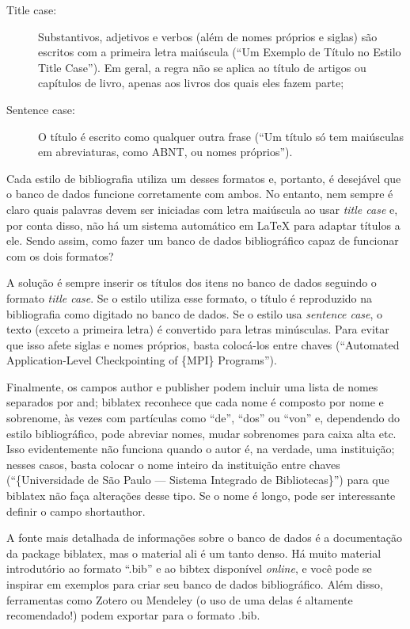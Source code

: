 \begin{description}
  \item[Title case:] Substantivos, adjetivos e verbos (além de nomes
  próprios e siglas) são escritos com a primeira letra maiúscula (``Um
  Exemplo de Título no Estilo Title Case''). Em geral, a regra não se
  aplica ao título de artigos ou capítulos de livro, apenas aos livros
  dos quais eles fazem parte;

  \item[Sentence case:] O título é escrito como qualquer outra frase
  (``Um título só tem maiúsculas em abreviaturas, como ABNT, ou nomes
  próprios'').
\end{description}

Cada estilo de bibliografia utiliza um desses formatos e, portanto, é
desejável que o banco de dados funcione corretamente com ambos. No
entanto, nem sempre é claro quais palavras devem ser iniciadas com letra
maiúscula ao usar \textit{title case} e, por conta disso, não há um sistema
automático em \LaTeX{} para adaptar títulos a ele. Sendo assim, como fazer
um banco de dados bibliográfico capaz de funcionar com os dois formatos?

A solução é sempre inserir os títulos dos itens no banco de dados seguindo
o formato \textit{title case}. Se o estilo utiliza esse formato, o título
é reproduzido na bibliografia como digitado no banco de dados. Se o estilo
usa \textit{sentence case}, o texto (exceto a primeira letra) é convertido
para letras minúsculas. Para evitar que isso afete siglas e nomes próprios,
basta colocá-los entre chaves (``Automated Application-Level Checkpointing
of \{MPI\} Programs'').

Finalmente, os campos \textsf{author} e \textsf{publisher} podem incluir uma
lista de nomes separados por \textsf{and}; biblatex reconhece que cada nome é
composto por nome e sobrenome, às vezes com partículas como ``de'', ``dos''
ou ``von'' e, dependendo do estilo bibliográfico, pode abreviar nomes, mudar
sobrenomes para caixa alta etc. Isso evidentemente não funciona quando o autor
é, na verdade, uma instituição; nesses casos, basta colocar o nome inteiro da
instituição entre chaves (``\{Universidade de São Paulo --- Sistema Integrado
de Bibliotecas\}'') para que biblatex não faça alterações desse tipo. Se o
nome é longo, pode ser interessante definir o campo \textsf{shortauthor}.

A fonte mais detalhada de informações sobre o banco de dados é a
documentação da package biblatex, mas o material ali é um tanto denso.
Há muito material introdutório ao formato ``.bib'' e ao bibtex disponível
\emph{online}, e você pode se inspirar em exemplos para criar seu banco de
dados bibliográfico. Além disso, ferramentas como Zotero ou
Mendeley (o uso de uma delas é altamente recomendado!)
podem exportar para o formato .bib.

